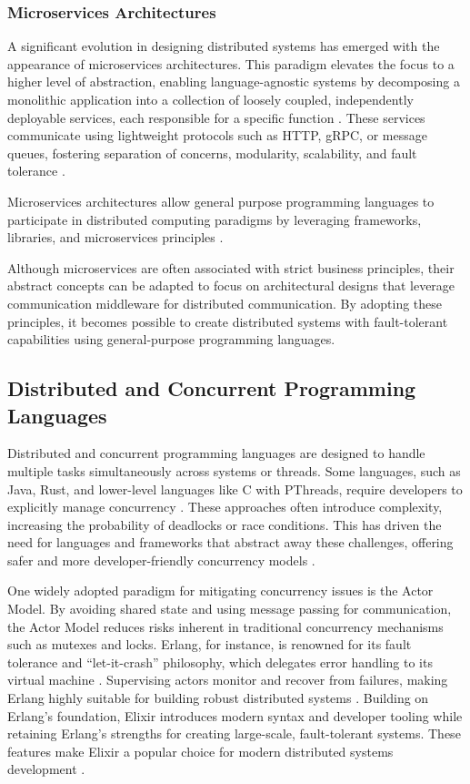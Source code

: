 \subsubsection{Microservices Architectures}

A significant evolution in designing distributed systems has emerged with the appearance of microservices architectures. This paradigm elevates the focus to a higher level of abstraction, enabling language-agnostic systems by decomposing a monolithic application into a collection of loosely coupled, independently deployable services, each responsible for a specific function \cite{Jamshidi2018}. These services communicate using lightweight protocols such as \gls{HTTP}, \gls{gRPC}, or message queues, fostering separation of concerns, modularity, scalability, and fault tolerance \cite{Jamshidi2018}.

Microservices architectures allow general purpose programming languages to participate in distributed computing paradigms by leveraging frameworks, libraries, and microservices principles \cite{Guidi2017}.

Although microservices are often associated with strict business principles, their abstract concepts can be adapted to focus on architectural designs that leverage communication middleware for distributed communication. By adopting these principles, it becomes possible to create distributed systems with fault-tolerant capabilities using general-purpose programming languages.


\subsection{Distributed and Concurrent Programming Languages}

Distributed and concurrent programming languages are designed to handle multiple tasks simultaneously across systems or threads. Some languages, such as Java, Rust, and lower-level languages like C with PThreads, require developers to explicitly manage concurrency \cite{Valkov2018,Paduraru2018}. These approaches often introduce complexity, increasing the probability of deadlocks or race conditions. This has driven the need for languages and frameworks that abstract away these challenges, offering safer and more developer-friendly concurrency models \cite{Valkov2018}.

One widely adopted paradigm for mitigating concurrency issues is the Actor Model. By avoiding shared state and using message passing for communication, the Actor Model reduces risks inherent in traditional concurrency mechanisms such as mutexes and locks. Erlang, for instance, is renowned for its fault tolerance and “let-it-crash” philosophy, which delegates error handling to its virtual machine \cite{Nystrom2009}. Supervising actors monitor and recover from failures, making Erlang highly suitable for building robust distributed systems \cite{Armstrong2013}. Building on Erlang’s foundation, Elixir introduces modern syntax and developer tooling while retaining Erlang’s strengths for creating large-scale, fault-tolerant systems. These features make Elixir a popular choice for modern distributed systems development \cite{Juric2024}.

